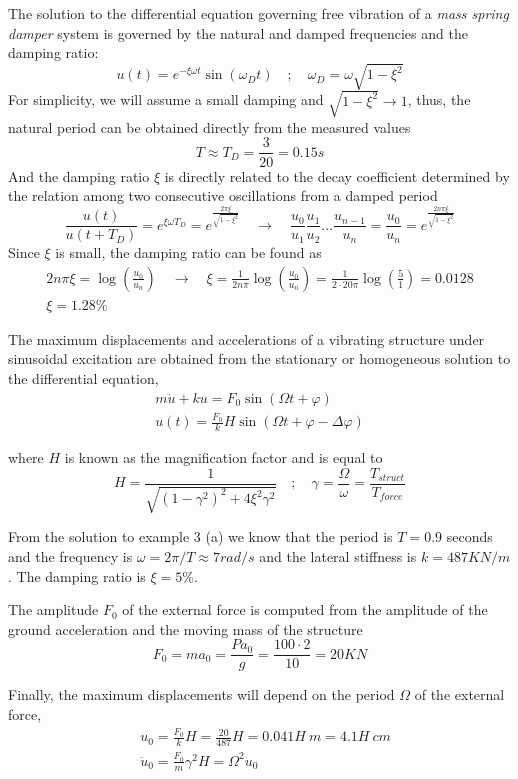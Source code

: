 \documentclass{problems}
\begin{document}
The solution to the differential equation governing free vibration of a \emph{mass spring damper} system is governed by the natural and damped frequencies and the damping ratio:
$$
u(t) = e^{-\xi\omega t}\sin(\omega_D t) \quad ; \quad \omega_D = \omega\sqrt{1-\xi^2}
$$
For simplicity, we will assume a small damping and $\sqrt{1-\xi^2}\rightarrow1$, thus, the natural period can be obtained directly from the measured values
$$
T \approx T_D = \frac{3}{20} = 0.15s
$$
And the damping ratio $\xi$ is directly related to the decay coefficient determined by the relation among two consecutive oscillations from a damped period
$$
\frac{u(t)}{u(t+T_D)} = e^{\xi\omega T_D} = e^{\frac{2\pi\xi}{\sqrt{1-\xi^2}}} \quad \rightarrow \quad
\frac{u_0}{u_1} \frac{u_1}{u_2} \dots \frac{u_{n-1}}{u_n} = \frac{u_0}{u_n} = e^{\frac{2n\pi\xi}{\sqrt{1-\xi^2}}}
$$
Since $\xi$ is small, the damping ratio can be found as
\begin{align*}
2n\pi\xi = \log\left(\frac{u_0}{u_n}\right) \quad \rightarrow \quad
\xi = \frac{1}{2n\pi} \log\left(\frac{u_0}{u_n}\right) = \frac{1}{2\cdot20\pi} \log\left(\frac{5}{1}\right) = 0.0128 \\
\xi = 1.28\%
\end{align*}



The maximum displacements and accelerations of a vibrating structure under sinusoidal excitation are obtained from the stationary or homogeneous solution to the differential equation,
\begin{align*}
m\ddot{u} + ku = F_0\sin(\Omega t + \varphi) \\
u(t) = \frac{F_0}{k}H\sin(\Omega t + \varphi - \Delta\varphi)
\end{align*}

where $H$ is known as the magnification factor and is equal to
$$
H = \frac{1}{\sqrt{(1-\gamma^2)^2 + 4\xi^2\gamma^2}} \quad ; \quad
\gamma = \frac{\Omega}{\omega} = \frac{T_{struct}}{T_{force}}
$$

From the solution to example 3 (a) we know that the period is $T=0.9$ seconds and the frequency is $\omega = 2\pi/T \approx 7rad/s$ and the lateral stiffness is $k=487KN/m$. The damping ratio is $\xi=5\%$.

The amplitude $F_0$ of the external force is computed from the amplitude of the ground acceleration and the moving mass of the structure
$$
F_0 = ma_{0} = \frac{Pa_0}{g} = \frac{100\cdot2}{10} = 20KN
$$

Finally, the maximum displacements will depend on the period $\Omega$ of the external force,
\begin{align*}
&u_0 = \frac{F_0}{k}H = \frac{20}{487}H = 0.041H\ m = 4.1H\ cm \\
&\ddot{u}_0 = \frac{F_0}{m}\gamma^2H = \Omega^2u_0
\end{align*}
\end{document}
